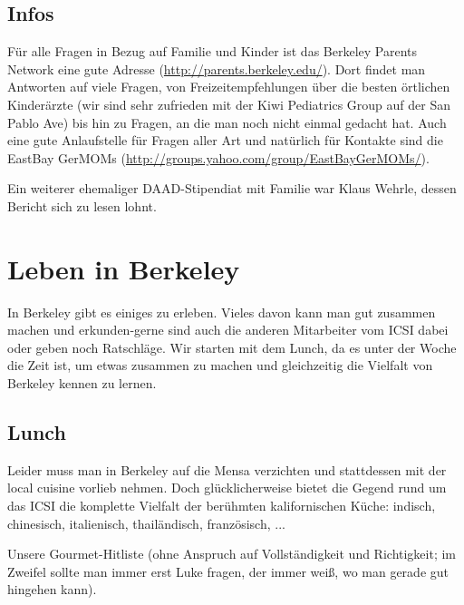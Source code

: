 \documentclass[a4paper]{scrreprt}
\begin{document}
\section{Infos}

Für alle Fragen in Bezug auf Familie und Kinder ist das Berkeley Parents Network eine gute Adresse (\url{http://parents.berkeley.edu/}). Dort findet man Antworten auf viele Fragen, von Freizeitempfehlungen über die besten örtlichen Kinderärzte (wir sind sehr zufrieden mit der Kiwi Pediatrics Group auf der San Pablo Ave) bis hin zu Fragen, an die man noch nicht einmal gedacht hat. Auch eine gute Anlaufstelle für Fragen aller Art und natürlich für Kontakte sind die EastBay GerMOMs (\url{http://groups.yahoo.com/group/EastBayGerMOMs/}).

Ein weiterer ehemaliger DAAD-Stipendiat mit Familie war Klaus Wehrle, dessen Bericht sich zu lesen lohnt.

\chapter{Leben in Berkeley}

In Berkeley gibt es einiges zu erleben. Vieles davon kann man gut zusammen machen und erkunden-gerne sind auch die anderen Mitarbeiter vom ICSI dabei oder geben noch Ratschläge. Wir starten mit dem Lunch, da es unter der Woche die Zeit ist, um etwas zusammen zu machen und gleichzeitig die Vielfalt von Berkeley kennen zu lernen.

\section{Lunch}

Leider muss man in Berkeley auf die Mensa verzichten und stattdessen mit der local cuisine vorlieb nehmen. Doch glücklicherweise bietet die Gegend rund um das ICSI die komplette Vielfalt der berühmten kalifornischen Küche: indisch, chinesisch, italienisch, thailändisch, französisch, ...

Unsere Gourmet-Hitliste (ohne Anspruch auf Vollständigkeit und Richtigkeit; im Zweifel sollte man immer erst Luke fragen, der immer weiß, wo man gerade gut hingehen kann).
\end{document}
